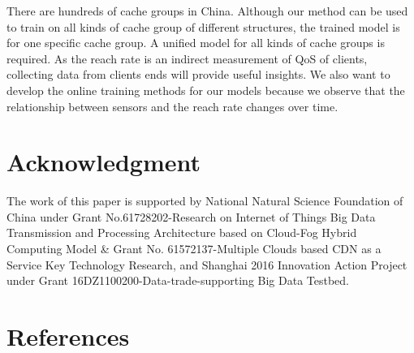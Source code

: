 \documentclass[5p]{elsarticle}
\begin{document}
There are hundreds of cache groups in China. Although our method can be used to train on all kinds of cache group of different structures, the trained model is for one specific cache group. A unified model for all kinds of cache groups is required. As the reach rate is an indirect measurement of QoS of clients, collecting data from clients ends will provide useful insights. We also want to develop the online training methods for our models because we observe that the relationship between sensors and the reach rate changes over time.

\section{Acknowledgment}
The work of this paper is supported by National Natural Science Foundation of China under Grant No.61728202-Research on Internet of Things Big Data Transmission and Processing Architecture based on Cloud-Fog Hybrid Computing Model & Grant No. 61572137-Multiple Clouds based CDN as a Service Key Technology Research, and Shanghai 2016 Innovation Action Project under Grant 16DZ1100200-Data-trade-supporting Big Data Testbed.


\section*{References}


\end{document}

